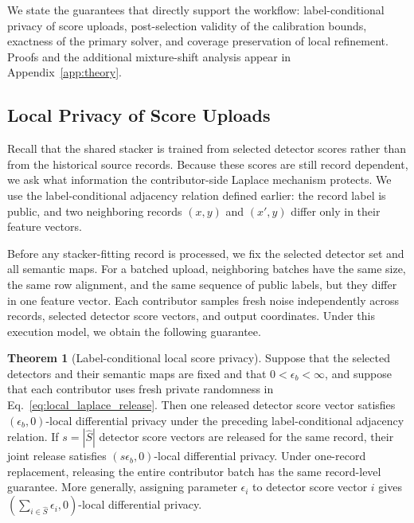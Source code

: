 \documentclass[conference]{IEEEtran}
\theoremstyle{definition}
\newtheorem{theorem}{Theorem}[section]
\begin{document}
We state the guarantees that directly support the workflow: label-conditional privacy of score uploads, post-selection validity of the calibration bounds, exactness of the primary solver, and coverage preservation of local refinement. Proofs and the additional mixture-shift analysis appear in Appendix~\ref{app:theory}.

\subsection{Local Privacy of Score Uploads}

Recall that the shared stacker is trained from selected detector scores rather than from the historical source records.
Because these scores are still record dependent, we ask what information the contributor-side Laplace mechanism protects.
We use the label-conditional adjacency relation defined earlier: the record label is public, and two neighboring records $(x,y)$ and $(x',y)$ differ only in their feature vectors.

Before any stacker-fitting record is processed, we fix the selected detector set and all semantic maps.
For a batched upload, neighboring batches have the same size, the same row alignment, and the same sequence of public labels, but they differ in one feature vector.
Each contributor samples fresh noise independently across records, selected detector score vectors, and output coordinates.
Under this execution model, we obtain the following guarantee.

\begin{theorem}[Label-conditional local score privacy]
\label{thm:local_score_privacy}
Suppose that the selected detectors and their semantic maps are fixed and that $0<\epsilon_b<\infty$, and suppose that each contributor uses fresh private randomness in Eq.~\ref{eq:local_laplace_release}.
Then one released detector score vector satisfies $(\epsilon_b,0)$-local differential privacy under the preceding label-conditional adjacency relation.
If $s=|\widehat S|$ detector score vectors are released for the same record, their joint release satisfies $(s\epsilon_b,0)$-local differential privacy.
Under one-record replacement, releasing the entire contributor batch has the same record-level guarantee.
More generally, assigning parameter $\epsilon_i$ to detector score vector $i$ gives $(\sum_{i\in\widehat S}\epsilon_i,0)$-local differential privacy.
\end{theorem}

\end{document}
